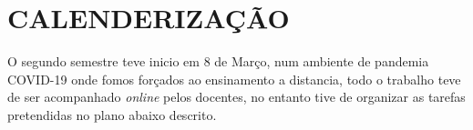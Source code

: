\section{CALENDERIZAÇÃO}
O segundo semestre teve inicio em 8 de Março, num ambiente de pandemia COVID-19 onde fomos forçados ao ensinamento a distancia, todo o trabalho teve de ser acompanhado \textit{online} pelos docentes, no entanto tive de organizar as tarefas pretendidas no plano abaixo descrito.
\\
\\

